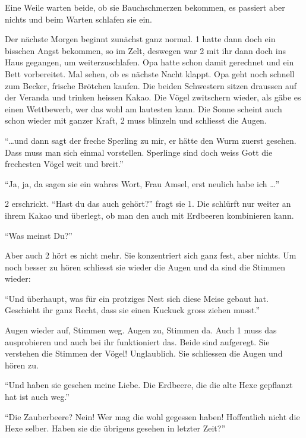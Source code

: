 \begin{mdframed}[style=mystyle]
Eine Weile warten beide, ob sie Bauchschmerzen bekommen, es passiert aber nichts und beim Warten schlafen sie ein.

\begin{center}
\aldineleft
\end{center}

Der nächste Morgen beginnt zunächst ganz normal. 1 hatte dann doch ein bisschen Angst bekommen, so im Zelt, deswegen war 2 mit ihr dann doch ins Haus gegangen, um weiterzuschlafen. Opa hatte schon damit gerechnet und ein Bett vorbereitet. Mal sehen, ob es nächste Nacht klappt. Opa geht noch schnell zum Becker, frische Brötchen kaufen. Die beiden Schwestern sitzen draussen auf der Veranda und trinken heissen Kakao. Die Vögel zwitschern wieder, als gäbe es einen Wettbewerb, wer das wohl am lautesten kann. Die Sonne scheint auch schon wieder mit ganzer Kraft, 2 muss blinzeln und schliesst die Augen.

\enquote{\dots und dann sagt der freche Sperling zu mir, er hätte den Wurm zuerst gesehen. Dass muss man sich einmal vorstellen. Sperlinge sind doch weiss Gott die frechesten Vögel weit und breit.}

\enquote{Ja, ja, da sagen sie ein wahres Wort, Frau Amsel, erst neulich habe ich \dots}

2 erschrickt. \enquote{Hast du das auch gehört?} fragt sie 1. Die schlürft nur weiter an ihrem Kakao und überlegt, ob man den auch mit Erdbeeren kombinieren kann.

\enquote{Was meinst Du?}

Aber auch 2 hört es nicht mehr. Sie konzentriert sich ganz fest, aber nichts. Um noch besser zu hören schliesst sie wieder die Augen und da sind die Stimmen wieder:

\enquote{Und überhaupt, was für ein protziges Nest sich diese Meise gebaut hat. Geschieht ihr ganz Recht, dass sie einen Kuckuck gross ziehen musst.}  

Augen wieder auf, Stimmen weg. Augen zu, Stimmen da. Auch 1 muss das ausprobieren und auch bei ihr funktioniert das. Beide sind aufgeregt. Sie verstehen die Stimmen der Vögel! Unglaublich. Sie schliessen die Augen und hören zu.

\enquote{Und haben sie gesehen meine Liebe. Die Erdbeere, die die alte Hexe gepflanzt hat ist auch weg.}

\enquote{Die Zauberbeere? Nein! Wer mag die wohl gegessen haben! Hoffentlich nicht die Hexe selber. Haben sie die übrigens gesehen in letzter Zeit?}


\end{mdframed}
